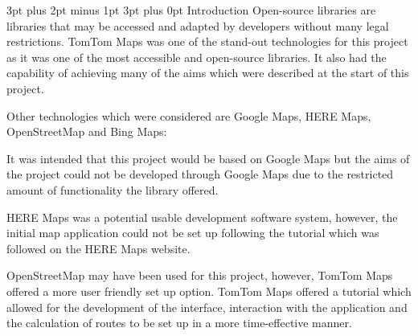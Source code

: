 \documentclass[12pt,a4paper]{article}
\makeatletter
\renewcommand\subsection{\@startsection {subsection}{1}{0mm} %
                               {3pt plus 2pt minus 1pt} %
                               {3pt plus 0pt} %
                               {\normalfont\bfseries}}
\makeatother
\begin{document}
\subsection{Introduction}
Open-source libraries are libraries that may be accessed and adapted by developers without many legal restrictions. TomTom Maps was one of the stand-out technologies for this project as it was one of the most accessible and open-source libraries. It also had the capability of achieving many of the aims which were described at the start of this project.  

Other technologies which were considered are Google Maps, HERE Maps, OpenStreetMap and Bing Maps: 

It was intended that this project would be based on Google Maps but the aims of the project could not be developed through Google Maps due to the restricted amount of functionality the library offered. 

HERE Maps was a potential usable development software system, however, the initial map application could not be set up following the tutorial which was followed on the HERE Maps website. 

OpenStreetMap may have been used for this project, however, TomTom Maps offered a more user friendly set up option. TomTom Maps offered a tutorial which allowed for the development of the interface, interaction with the application and the calculation of routes to be set up in a more time-effective manner.
\newpage
\end{document}
